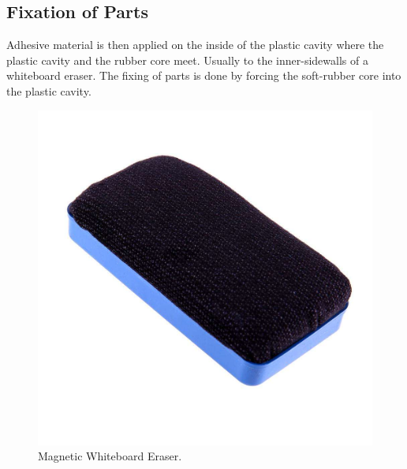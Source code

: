 \documentclass[12pt,a4paper,oneside]{article}
\begin{document}
\subsection{Fixation of Parts}

Adhesive material is then applied on the inside of the plastic cavity where the plastic cavity and the rubber core meet. Usually to the inner-sidewalls of a whiteboard eraser. The fixing of parts is done by forcing the soft-rubber core into the plastic cavity. 


\begin{figure}[h]
    \includegraphics[width=1\textwidth]{whiteboard-magnetic}
    \caption{Magnetic Whiteboard Eraser.}
\end{figure}
\newpage

\clearpage
{}
\printbibliography
\end{document}
